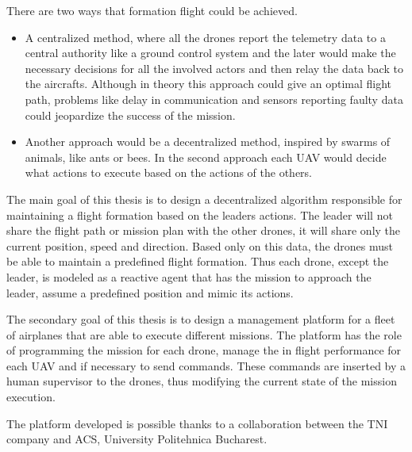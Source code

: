 There are two ways that formation flight could be achieved. 
\begin{itemize}
\item A centralized method,  where all the drones report the telemetry data to a central
authority like a ground control system and the later would make the necessary 
decisions for all the involved actors and then relay the data back to the aircrafts.
Although in theory this approach could give an optimal flight path,  problems
like delay in communication and sensors reporting faulty data could jeopardize
the success of the mission. 
\item Another approach would be a decentralized method, 
inspired by swarms of animals, like ants or bees. In the second approach each 
UAV would decide what actions to execute based on the actions of the others.
\end{itemize}


The main goal of this thesis is to design a decentralized algorithm responsible
for maintaining a flight formation based on the leaders actions. The leader will
not share the flight path or mission plan with the other drones, it will share
only the current position, speed and direction. Based only on this data, the 
drones must be able to maintain a predefined flight formation. Thus each drone, 
except the leader, is modeled as a reactive agent that has the mission to 
approach the leader, assume a predefined position and mimic its actions.

The secondary goal of this thesis is to design a management platform for a 
fleet of airplanes that are able to execute different missions. The platform has
the role of programming the mission for each drone,  manage the in flight
performance for each UAV and if necessary to send commands. These commands are inserted by a human
supervisor to the drones, thus modifying the current state of the mission
execution.

The platform developed is possible thanks to a collaboration between the 
TNI company and ACS, University Politehnica Bucharest.


